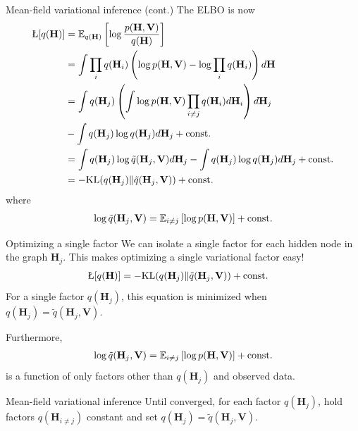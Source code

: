 \documentclass[10pt, compress]{beamer}
\begin{document}
\begin{frame}{Mean-field variational inference (cont.)}
  The ELBO is now
  \begin{align*}
    \L[q(\mathbf{H})] &= \E_{q(\mathbf{H})} \left[\log\frac{p(\mathbf{H}, \mathbf{V})}{q(\mathbf{H})}\right] \\
                      &= \int\prod_i q(\mathbf{H}_i) \left(\log p(\mathbf{H}, \mathbf{V}) - \log \prod_i q(\mathbf{H}_i)\right)d\mathbf{H}\\
                      &= \int q(\mathbf{H}_j) \left(\int \log p(\mathbf{H}, \mathbf{V})\prod_{i \neq j}q(\mathbf{H}_i)d\mathbf{H}_i \right)d\mathbf{H}_j \\&- \int q(\mathbf{H}_j)\log q(\mathbf{H}_j)d \mathbf{H}_j + \textrm{const.}\\
                      &= \int q(\mathbf{H}_j)\log \tilde{q}(\mathbf{H}_j, \mathbf{V})d \mathbf{H}_j- \int q(\mathbf{H}_j)\log q(\mathbf{H}_j)d \mathbf{H}_j  + \textrm{const.} \\
                      &= -\KL(q(\mathbf{H}_j)\|\tilde{q}(\mathbf{H}_j, \mathbf{V}))  + \textrm{const.}
  \end{align*}
  where 
  \begin{align*}
    \log\tilde{q}(\mathbf{H}_j, \mathbf{V}) = \mathbb{E}_{i \neq j}\left[\log p(\mathbf{H}, \mathbf{V})\right] + \textrm{const.}
  \end{align*}

\end{frame}

\begin{frame}{Optimizing a single factor}
  We can isolate a single factor for each hidden node in the graph $\mathbf{H}_j$.
  This makes optimizing a single variational factor easy!
  \pause
  \begin{align*}
    \L[q(\mathbf{H})] &= -\KL(q(\mathbf{H}_j)\|\tilde{q}(\mathbf{H}_j, \mathbf{V}))  + \textrm{const.}
  \end{align*}
  \pause
  For a single factor $q(\mathbf{H}_j)$, this equation is minimized
  when $q(\mathbf{H}_j) = \tilde{q}(\mathbf{H}_j, \mathbf{V})$.

  \pause
  Furthermore, 
  \begin{align*}
    \log\tilde{q}(\mathbf{H}_j, \mathbf{V}) = \mathbb{E}_{i \neq j}\left[\log p(\mathbf{H}, \mathbf{V})\right] + \textrm{const.}
  \end{align*}
  is a function of only factors other than $q(\mathbf{H}_j)$  and observed data.

  \pause
  \begin{block}{Mean-field variational inference}
    Until converged,
    for each factor $q(\mathbf{H}_j)$,
    hold factors $q(\mathbf{H}_{i \neq j})$ constant and
    set $q(\mathbf{H}_j) = \tilde{q}(\mathbf{H}_j, \mathbf{V})$.
  \end{block}
\end{frame}
\end{document}

